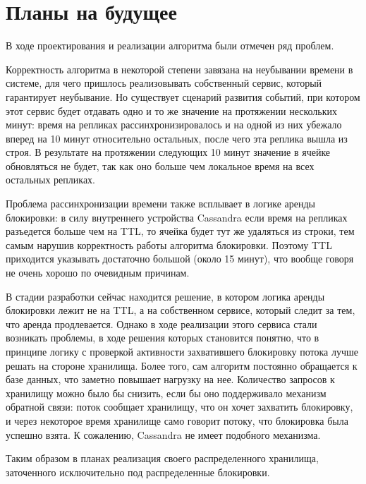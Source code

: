 \section{Планы на будущее}

В ходе проектирования и реализации алгоритма были отмечен ряд проблем.

Корректность алгоритма в некоторой степени завязана на неубывании времени в системе, для чего пришлось реализовывать собственный сервис, который гарантирует неубывание. Но существует сценарий развития событий, при котором этот сервис будет отдавать одно и то же значение на протяжении нескольких минут: время на репликах рассинхронизировалось и на одной из них убежало вперед на 10 минут относительно остальных, после чего эта реплика вышла из строя. В результате на протяжении следующих 10 минут значение в ячейке обновляться не будет, так как оно больше чем локальное время на всех остальных репликах.

Проблема рассинхронизации времени также всплывает в логике аренды блокировки: в силу внутреннего устройства Cassandra если время на репликах разъедется больше чем на TTL, то ячейка будет тут же удаляться из строки, тем самым нарушив корректность работы алгоритма блокировки. Поэтому TTL приходится указывать достаточно большой (около 15 минут), что вообще говоря не очень хорошо по очевидным причинам.

В стадии разработки сейчас находится решение, в котором логика аренды блокировки лежит не на TTL, а на собственном сервисе, который следит за тем, что аренда продлевается. Однако в ходе реализации этого сервиса стали возникать проблемы, в ходе решения которых становится понятно, что в принципе логику с проверкой активности захватившего блокировку потока лучше решать на стороне хранилища. Более того, сам алгоритм постоянно обращается к базе данных, что заметно повышает нагрузку на нее. Количество запросов к хранилищу можно было бы снизить, если бы оно поддерживало механизм обратной связи: поток сообщает хранилищу, что он хочет захватить блокировку, и через некоторое время хранилище само говорит потоку, что блокировка была успешно взята. К сожалению, Cassandra не имеет подобного механизма.

Таким образом в планах реализация своего распределенного хранилища, заточенного исключительно под распределенные блокировки.